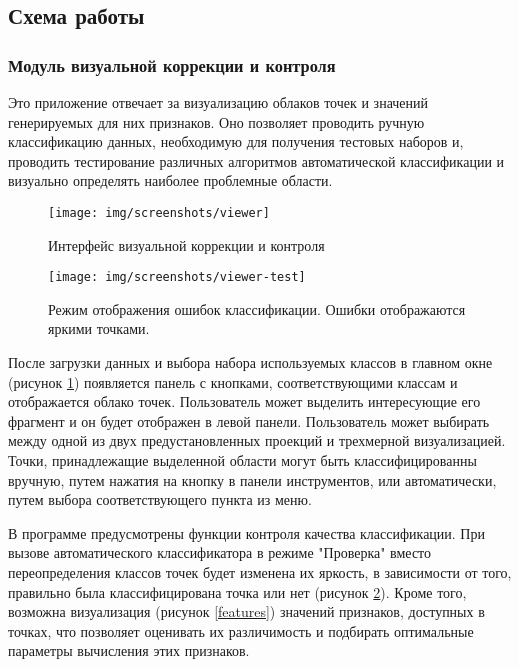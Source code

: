 \subsection{Схема работы}

\subsubsection{Модуль визуальной коррекции и контроля}

Это приложение отвечает за визуализацию облаков точек и значений генерируемых для них признаков. Оно позволяет проводить ручную классификацию данных, необходимую для получения тестовых наборов и, проводить тестирование различных алгоритмов автоматической классификации и визуально определять наиболее проблемные области.

\begin{figure}[!h]
\begin{center}
\texttt{[image: img/screenshots/viewer]}
\end{center}
\caption{Интерфейс визуальной коррекции и контроля}
\label{viewer}
\end{figure}
\begin{figure}[!h]
\begin{center}
\texttt{[image: img/screenshots/viewer-test]}
\end{center}
\caption{Режим отображения ошибок классификации. Ошибки отображаются яркими точками.}
\label{viewer-test}
\end{figure}

После загрузки данных и выбора набора используемых классов в главном окне (рисунок \ref{viewer}) появляется панель с кнопками, соответствующими классам и отображается облако точек. Пользователь может выделить интересующие его фрагмент и он будет отображен в левой панели. Пользователь может выбирать между одной из двух предустановленных проекций и трехмерной визуализацией. Точки, принадлежащие выделенной области могут быть классифицированны вручную, путем нажатия на кнопку в панели инструментов, или автоматически, путем выбора соответствующего пункта из меню.

В программе предусмотрены функции контроля качества классификации. При вызове автоматического классификатора в режиме "Проверка" вместо переопределения классов точек будет изменена их яркость, в зависимости от того, правильно была классифицирована точка или нет (рисунок \ref{viewer-test}). Кроме того, возможна визуализация (рисунок \ref{features}) значений признаков, доступных в точках, что позволяет оценивать их различимость и подбирать оптимальные параметры вычисления этих  признаков.

